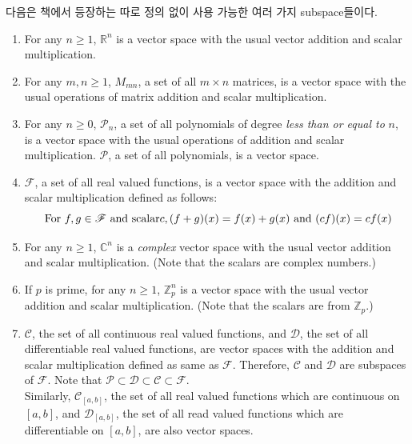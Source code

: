 다음은 책에서 등장하는 따로 정의 없이 사용 가능한 여러 가지 subspace들이다.
\begin{enumerate}
	\item For any $n \ge 1$, $\mathbb{R}^n$ is a vector space with the usual vector addition and scalar multiplication.
	\item For any $m, n\ge 1$, $M_{mn}$, a set of all $m \times n$ matrices, is a vector space with the usual operations of matrix addition and scalar multiplication.
	\item For any $n \ge 0$, $\mathscr{P}_n$, a set of all polynomials of degree\textit{ less than or equal to} $n$, is a vector space with the usual operations of addition and scalar multiplication. $\mathscr{P}$, a set of all polynomials, is a vector space.
	\item $\mathscr{F}$, a set of all real valued functions, is a vector space with the addition and scalar multiplication defined as follows: \begin{equation*}
		\textnormal{ For } f, g \in \mathscr{F} \textnormal{ and scalar} c, (f+g)(x) = f(x) + g(x) \mbox{ and } (cf)(x) = cf(x)
	\end{equation*}
	\item For any $n \ge 1$, $\mathbb{C}^n$ is a \textit{complex} vector space with the usual vector addition and scalar multiplication. (Note that the scalars are complex numbers.)
	\item If $p$ is prime, for any $n \ge 1$, $\mathbb{Z}^n_p$ is a vector space with the usual vector addition and scalar multiplication. (Note that the scalars are from $\mathbb{Z}_p$.)
	\item $\mathscr{C}$, the set of all continuous real valued functions, and $\mathscr{D}$, the set of all differentiable real valued functions, are vector spaces with the addition and scalar multiplication defined as same as $\mathscr{F}$. Therefore, $\mathscr{C}$ and $\mathscr{D}$ are subspaces of $\mathscr{F}$. Note that $\mathscr{P} \subset \mathscr{D} \subset \mathscr{C} \subset \mathscr{F}$. \\
	Similarly, $\mathscr{C}_{[a,b]}$, the set of all real valued functions which are continuous on $[a, b]$, and $\mathscr{D}_{[a, b]}$, the set of all read valued functions which are differentiable on $[a, b]$, are also vector spaces.
\end{enumerate}

